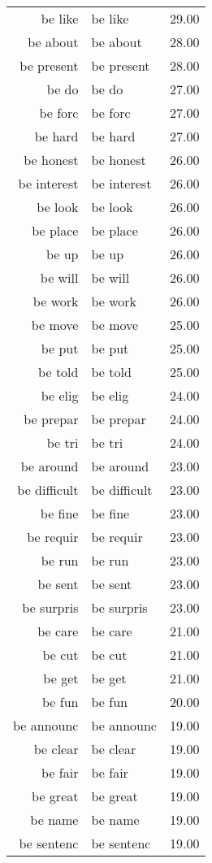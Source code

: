 \begin{table}[ht]
\begin{tabular}{rlr}
  be like & be like & 29.00 \\ 
  be about & be about & 28.00 \\ 
  be present & be present & 28.00 \\ 
  be do & be do & 27.00 \\ 
  be forc & be forc & 27.00 \\ 
  be hard & be hard & 27.00 \\ 
  be honest & be honest & 26.00 \\ 
  be interest & be interest & 26.00 \\ 
  be look & be look & 26.00 \\ 
  be place & be place & 26.00 \\ 
  be up & be up & 26.00 \\ 
  be will & be will & 26.00 \\ 
  be work & be work & 26.00 \\ 
  be move & be move & 25.00 \\ 
  be put & be put & 25.00 \\ 
  be told & be told & 25.00 \\ 
  be elig & be elig & 24.00 \\ 
  be prepar & be prepar & 24.00 \\ 
  be tri & be tri & 24.00 \\ 
  be around & be around & 23.00 \\ 
  be difficult & be difficult & 23.00 \\ 
  be fine & be fine & 23.00 \\ 
  be requir & be requir & 23.00 \\ 
  be run & be run & 23.00 \\ 
  be sent & be sent & 23.00 \\ 
  be surpris & be surpris & 23.00 \\ 
  be care & be care & 21.00 \\ 
  be cut & be cut & 21.00 \\ 
  be get & be get & 21.00 \\ 
  be fun & be fun & 20.00 \\ 
  be announc & be announc & 19.00 \\ 
  be clear & be clear & 19.00 \\ 
  be fair & be fair & 19.00 \\ 
  be great & be great & 19.00 \\ 
  be name & be name & 19.00 \\ 
  be sentenc & be sentenc & 19.00 \\ 

\end{tabular}
\end{table}
